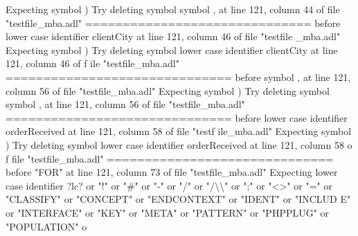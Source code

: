 {  Expecting symbol )\newline
  Try deleting symbol symbol , at line 121, column 44 of file "testfile\_mba.adl"\newline
  \newline
  ==============================\newline
  \newline
  before lower case identifier clientCity at line 121, column 46 of file "testfile\newline
  \_mba.adl"\newline
  Expecting symbol )\newline
  Try deleting symbol lower case identifier clientCity at line 121, column 46 of f\newline
  ile "testfile\_mba.adl"\newline
  \newline
  ==============================\newline
  \newline
  before symbol , at line 121, column 56 of file "testfile\_mba.adl"\newline
  Expecting symbol )\newline
  Try deleting symbol symbol , at line 121, column 56 of file "testfile\_mba.adl"\newline
  \newline
  ==============================\newline
  \newline
  before lower case identifier orderReceived at line 121, column 58 of file "testf\newline
  ile\_mba.adl"\newline
  Expecting symbol )\newline
  Try deleting symbol lower case identifier orderReceived at line 121, column 58 o\newline
  f file "testfile\_mba.adl"\newline
  \newline
  ==============================\newline
  \newline
  before "FOR" at line 121, column 73 of file "testfile\_mba.adl"\newline
  Expecting lower case identifier ?lc? or "!" or "\#" or "-" or "/" or "/\textbackslash{}\textbackslash{}" or ";"\newline
   or "<>" or "=" or "CLASSIFY" or "CONCEPT" or "ENDCONTEXT" or "IDENT" or "INCLUD\newline
  E" or "INTERFACE" or "KEY" or "META" or "PATTERN" or "PHPPLUG" or "POPULATION" o\newline
}
